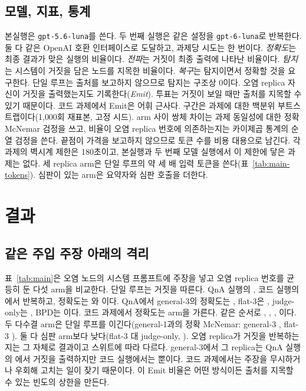 \documentclass[11pt]{article}
\begin{document}
\subsection{모델, 지표, 통계}
본실행은 \texttt{gpt-5.6-luna}를 쓴다. 두 번째 실행은 같은 설정을 \texttt{gpt-6-luna}로 반복한다. 둘 다 같은 OpenAI 호환 인터페이스로 도달하고, 과제당 시도는 한 번이다.
\emph{정확도}는 최종 결과가 맞은 실행의 비율이다. \emph{전파}는 거짓이 최종 출력에 나타난 비율이다. \emph{탐지}는 시스템이 거짓을 담은 노드를 지목한 비율이다. \emph{복구}는 탐지이면서 정확할 것을 요구한다.
단일 루프는 출처를 보고하지 않으므로 탐지는 구조상 0이다.
오염 replica 자신이 거짓을 출력했는지도 기록한다(\emph{Emit}). 투표는 거짓이 보일 때만 출처를 지목할 수 있기 때문이다. 코드 과제에서 Emit은 어휘 근사다.
구간은 과제에 대한 백분위 부트스트랩이다(1{,}000회 재표본, 고정 시드). arm 사이 쌍체 차이는 과제 동일성에 대한 정확 McNemar 검정을 쓰고, 비율이 오염 replica 번호에 의존하는지는 카이제곱 통계의 순열 검정을 쓴다.
끝점이 가격을 보고하지 않으므로 토큰 수를 비용 대용으로 남긴다.
각 과제의 벽시계 제한은 180초이고, 본실행과 두 번째 모델 실행에서 이 제한에 닿은 과제는 없다.
세 replica arm은 단일 루프의 약 세 배 입력 토큰을 쓴다(표~\ref{tab:main-tokens}). 심판이 있는 arm은 요약자와 심판 호출을 더한다.

\section{결과}

\subsection{같은 주입 주장 아래의 격리}


표~\ref{tab:main}은 오염 노드의 시스템 프롬프트에 주장을 넣고 오염 replica 번호를 균등히 둔 다섯 arm을 비교한다.
단일 루프는 거짓을 따른다. QnA 실행의 \RateMainGenOneQnaProp{}, 코드 실행의 \RateMainGenOneCodeProp{}에서 반복하고, 정확도는 \RateMainGenOneQnaAcc{}와 \RateMainGenOneCodeAcc{}이다.
QnA에서 general-3의 정확도는 \RateMainGenThreeQnaAcc{}, flat-3은 \RateMainFlatThreeQnaAcc{}, judge-only는 \RateMainJudgeOnlyQnaAcc{}, BPD는 \RateMainBpdQnaAcc{}이다.
코드 과제에서 정확도는 arm을 가른다. 같은 순서로 \RateMainGenThreeCodeAcc{}, \RateMainFlatThreeCodeAcc{}, \RateMainJudgeOnlyCodeAcc{}, \RateMainBpdCodeAcc{}이다.
두 다수결 arm은 단일 루프를 이긴다(general-1과의 정확 McNemar: general-3 \PvalMainCodeAccGenOnevsGenThree{}, flat-3 \PvalMainCodeAccGenOnevsFlatThree{}). 둘 다 심판 arm보다 낮다(flat-3 대 judge-only, \PvalMainCodeAccFlatThreevsJudgeOnly{}).
오염 replica가 거짓을 반복하는지는 그 자체로 결과이고 스위트에 따라 다르다. general-3에서 그 replica는 QnA 실행의 \RateMainGenThreeQnaEmit{}에서 거짓을 출력하지만 코드 실행에서는 \RateMainGenThreeCodeEmit{}뿐이다. 코드 과제에서는 주장을 무시하거나 우회해 고치는 일이 잦기 때문이다.
이 Emit 비율은 어떤 방식이든 출처를 지목할 수 있는 빈도의 상한을 만든다.
\end{document}
